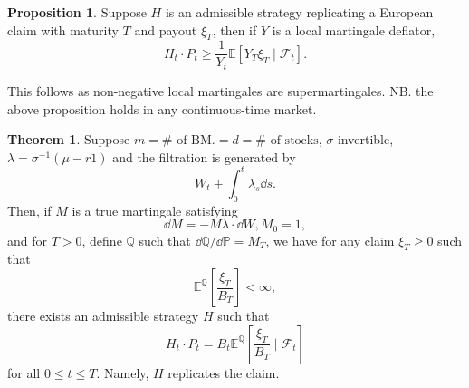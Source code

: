 \documentclass[]{article}
\theoremstyle{definition}
\newtheorem{theorem}{Theorem}
\newtheorem{proposition}{Proposition}[section]
\begin{document}
\begin{proposition}
  Suppose \(H\) is an admissible strategy replicating a European claim with maturity \(T\) and payout 
  \(\xi_T\), then if \(Y\) is a local martingale deflator, 
  \[H_t \cdot P_t \ge \frac{1}{Y_t} \mathbb{E}[Y_T \xi_T \mid \mathcal{F}_t].\] 
\end{proposition}

This follows as non-negative local martingales are supermartingales. NB. the above proposition holds 
in any continuous-time market.

\begin{theorem}
  Suppose \(m = \# \text{ of BM.} = d = \# \text{ of stocks}\), \(\sigma\) invertible, 
  \(\lambda = \sigma^{-1}(\mu - r1)\) and the filtration is generated by 
  \[W_t + \int_0^t \lambda_s \dd s.\] 
  Then, if \(M\) is a true martingale satisfying 
  \[\dd M = - M \lambda \cdot \dd W, M_0 = 1,\]
  and for \(T > 0\), define \(\mathbb{Q}\) such that \(\dd \mathbb{Q} / \dd \mathbb{P} = M_T\),
  we have for any claim \(\xi_T \ge 0\) such that 
  \[\mathbb{E}^{\mathbb{Q}}\left[\frac{\xi_T}{B_T}\right] < \infty,\]
  there exists an admissible strategy \(H\) such that 
  \[H_t \cdot P_t = B_t \mathbb{E}^\mathbb{Q}\left[\frac{\xi_T}{B_T} \mid \mathcal{F}_t\right]\]
  for all \(0 \le t \le T\). Namely, \(H\) replicates the claim.
\end{theorem}
\end{document}
